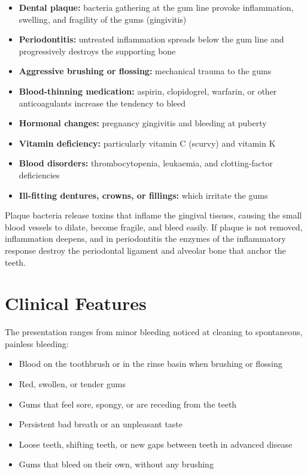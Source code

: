 \begin{itemize}
    \item \textbf{Dental plaque:} bacteria gathering at the gum line provoke inflammation, swelling, and fragility of the gums (gingivitis)
    \item \textbf{Periodontitis:} untreated inflammation spreads below the gum line and progressively destroys the supporting bone
    \item \textbf{Aggressive brushing or flossing:} mechanical trauma to the gums
    \item \textbf{Blood-thinning medication:} aspirin, clopidogrel, warfarin, or other anticoagulants increase the tendency to bleed
    \item \textbf{Hormonal changes:} pregnancy gingivitis and bleeding at puberty
    \item \textbf{Vitamin deficiency:} particularly vitamin C (scurvy) and vitamin K
    \item \textbf{Blood disorders:} thrombocytopenia, leukaemia, and clotting-factor deficiencies
    \item \textbf{Ill-fitting dentures, crowns, or fillings:} which irritate the gums
\end{itemize}

Plaque bacteria release toxins that inflame the gingival tissues, causing the small blood vessels to dilate, become fragile, and bleed easily. If plaque is not removed, inflammation deepens, and in periodontitis the enzymes of the inflammatory response destroy the periodontal ligament and alveolar bone that anchor the teeth.

\section*{Clinical Features}
The presentation ranges from minor bleeding noticed at cleaning to spontaneous, painless bleeding:

\begin{itemize}
    \item Blood on the toothbrush or in the rinse basin when brushing or flossing
    \item Red, swollen, or tender gums
    \item Gums that feel sore, spongy, or are receding from the teeth
    \item Persistent bad breath or an unpleasant taste
    \item Loose teeth, shifting teeth, or new gaps between teeth in advanced disease
    \item Gums that bleed on their own, without any brushing
\end{itemize}

